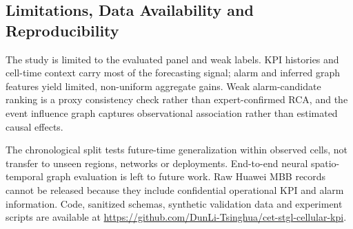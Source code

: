 \subsection{Limitations, Data Availability and Reproducibility}
\label{sec:limitations_reproducibility}
\label{sec:discussion_limitations}
\label{sec:data_availability}

The study is limited to the evaluated panel and weak labels. KPI histories and cell-time context carry most of the forecasting signal; alarm and inferred graph features yield limited, non-uniform aggregate gains. Weak alarm-candidate ranking is a proxy consistency check rather than expert-confirmed RCA, and the event influence graph captures observational association rather than estimated causal effects.

The chronological split tests future-time generalization within observed cells, not transfer to unseen regions, networks or deployments. End-to-end neural spatio-temporal graph evaluation is left to future work. Raw Huawei MBB records cannot be released because they include confidential operational KPI and alarm information. Code, sanitized schemas, synthetic validation data and experiment scripts are available at \url{https://github.com/DunLi-Tsinghua/cet-stgl-cellular-kpi}.
